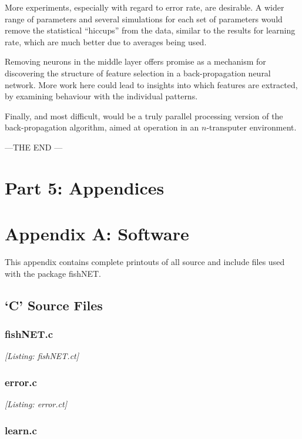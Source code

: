 \documentclass[12pt]{report}
\begin{document}
More experiments, especially with regard to error rate, are
desirable.
A wider range of parameters and several simulations for each
set of parameters would remove the statistical ``hiccups'' from the
data, similar to the results for learning rate, which are much
better due to averages being used.

Removing neurons in the middle layer offers promise as a mechanism
for discovering the structure of feature selection in a
back-propagation neural network.
More work here could lead to insights into which features are extracted,
by examining behaviour with the individual patterns.

Finally, and most difficult, would be a truly parallel processing
version of the back-propagation algorithm, aimed at operation in
an $n$-transputer environment.

{---{\eightrm THE END} ---}


\chapter*{Part 5: Appendices}

\chapter*{Appendix A: Software}

This appendix contains complete printouts of all source and include
files used with the package fishNET.

\section*{`C' Source Files}

\subsection*{fishNET.c}

\textit{[Listing: fishNET.ct]}

\subsection*{error.c}

\textit{[Listing: error.ct]}

\subsection*{learn.c}
\end{document}

